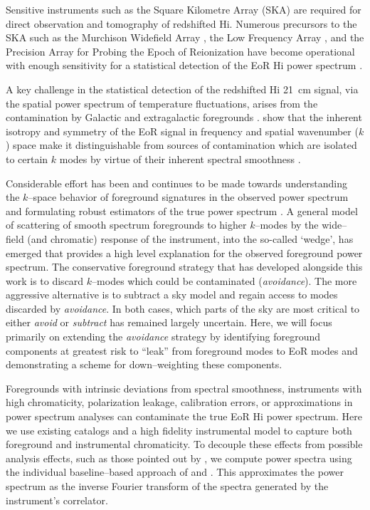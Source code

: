 \documentclass[preprint2,iop,numberedappendix]{emulateapj}
\begin{document}
Sensitive instruments such as the Square Kilometre Array (SKA) are required for direct observation and tomography of redshifted H{\sc i}. Numerous precursors to the SKA such as the Murchison Widefield Array \citep[MWA;][]{tin13,bow13,lon09}, the Low Frequency Array \citep[LOFAR;][]{van13}, and the Precision Array for Probing the Epoch of Reionization \citep[PAPER;][]{par10} have become operational with enough sensitivity for a statistical detection of the EoR H{\sc i} power spectrum \citep{bow06,bea13,dil13,thy13,pob14}. 

A key challenge in the statistical detection of the redshifted H{\sc i} 21~cm signal, via the spatial power spectrum of temperature fluctuations, arises from the contamination by Galactic and extragalactic foregrounds \citep[see, e.g.,][]{dim02,zal04,fur06,ali08,ber09,ber10,gho12}. \citet{mor04} show that the inherent isotropy and symmetry of the EoR signal in frequency and spatial wavenumber ($k$) space make it distinguishable from sources of contamination which are isolated to certain $k$ modes by virtue of their inherent spectral smoothness \citep{mor06,bow09,liu11,par12,dil13}.

Considerable effort has been and continues to be made towards understanding the $k$--space behavior of foreground signatures in the observed power spectrum and formulating robust estimators of the true power spectrum \citep{bow09,liu09,dat10,liu11,mor12,tro12,pob13,thy13,dil14,liu14a,liu14b}. A general model of scattering of smooth spectrum foregrounds to higher $k$--modes by the wide--field (and chromatic) response of the instrument, into the so-called `wedge', has emerged that provides a high level explanation for the observed foreground power spectrum. The conservative foreground strategy that has developed alongside this work is to discard $k$--modes which could be contaminated ({\it avoidance}). The more aggressive alternative is to subtract a sky model and regain access to modes discarded by {\it avoidance}. In both cases, which parts of the sky are most critical to either {\it avoid} or {\it subtract} has remained largely uncertain. Here, we will focus primarily on extending the {\it avoidance} strategy by identifying foreground components at greatest risk to ``leak'' from foreground modes to EoR modes and demonstrating a scheme for down--weighting these components.

Foregrounds with intrinsic deviations from spectral smoothness, instruments with high chromaticity, polarization leakage, calibration errors, or approximations in power spectrum analyses can contaminate the true EoR H{\sc i} power spectrum. Here we use existing catalogs and a high fidelity instrumental model to capture both foreground and instrumental chromaticity. To decouple these effects from possible analysis effects, such as those pointed out by \citet{haz13}, we compute power spectra using the individual baseline--based approach of \citet{pob13} and \citet{par14}. This approximates the power spectrum as the inverse Fourier transform of the spectra generated by the instrument's correlator. 
\end{document}
